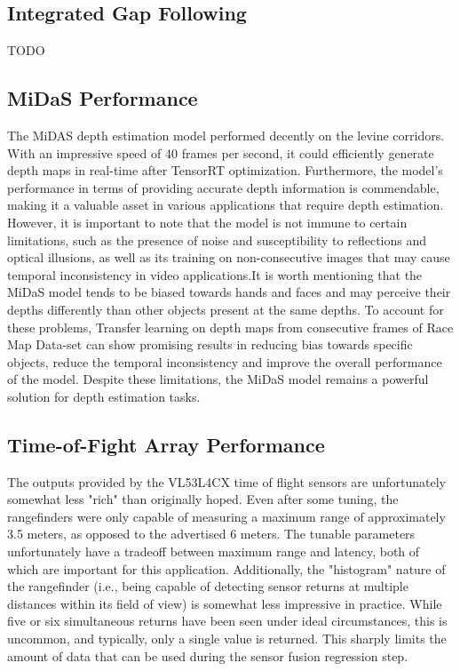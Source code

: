 \documentclass[conference]{IEEEtran}
\begin{document}
\subsection{Integrated Gap Following}
TODO

\subsection{MiDaS Performance}
The MiDAS depth estimation model performed decently on the levine corridors. With an impressive speed of 40 frames per second, it could efficiently generate depth maps in real-time after TensorRT optimization. Furthermore, the model's performance in terms of providing accurate depth information is commendable, making it a valuable asset in various applications that require depth estimation. However, it is important to note that the model is not immune to certain limitations, such as the presence of noise and susceptibility to reflections and optical illusions, as well as its training on non-consecutive images that may cause temporal inconsistency in video applications.It is worth mentioning that the MiDaS model tends to be biased towards hands and faces and may perceive their depths differently than other objects present at the same depths. To account for these problems, Transfer learning on depth maps from consecutive frames of Race Map Data-set can show promising results in reducing bias towards specific objects, reduce the temporal inconsistency and improve the overall performance of the model.  Despite these limitations, the MiDaS model remains a powerful solution for depth estimation tasks.

\subsection{Time-of-Fight Array Performance}
The outputs provided by the VL53L4CX time of flight sensors are unfortunately
somewhat less "rich" than originally hoped. Even after some tuning, the
rangefinders were only capable of measuring a maximum range of approximately
3.5 meters, as opposed to the advertised 6 meters. The tunable parameters
unfortunately have a tradeoff between maximum range and latency, both of which
are important for this application. Additionally, the "histogram" nature of the
rangefinder (i.e., being capable of detecting sensor returns at multiple
distances within its field of view) is somewhat less impressive in practice.
While five or six simultaneous returns have been seen under ideal
circumstances, this is uncommon, and typically, only a single value is
returned. This sharply limits the amount of data that can be used during the
sensor fusion regression step.
\end{document}
